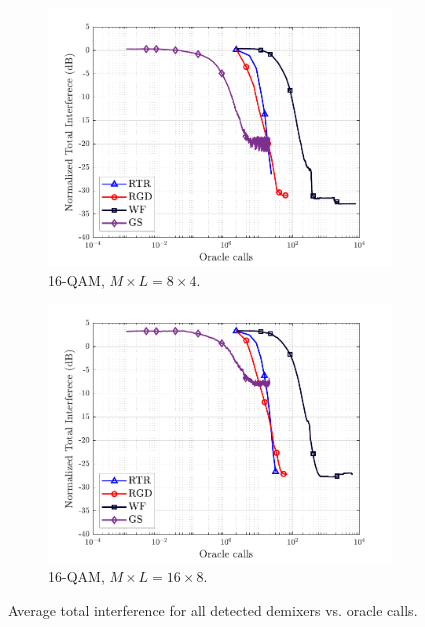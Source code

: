\begin{figure}[ht]
\begin{subfigure}{0.48\linewidth}
		\centering
		\includegraphics[width=0.95\linewidth]{./figs/rocma_figs/ROCMA_MSR_TI_QgSt_oracles_16QAM_L=4_M=8_J=4_nSim_100.pdf}
		\caption{16-QAM, $M\times L = 8\times4$.}\label{rocma:fig:CMA_ROCMA_oracles_8x4_16qam}
	\end{subfigure}
	\begin{subfigure}{0.48\linewidth}
		\centering
		\includegraphics[width=0.95\linewidth]{./figs/rocma_figs/ROCMA_MSR_TI_QgSt_oracles_16QAM_L=8_M=16_J=8_nSim_100.pdf}
		\caption{16-QAM, $M\times L = 16\times8$.}\label{rocma:fig:CMA_ROCMA_oracles_16x8_16qam}		
	\end{subfigure}
	\caption{Average total interference for all detected demixers vs. oracle calls. }
	\label{rocma:fig:CMA_ROCMA_oracles}
\end{figure}

